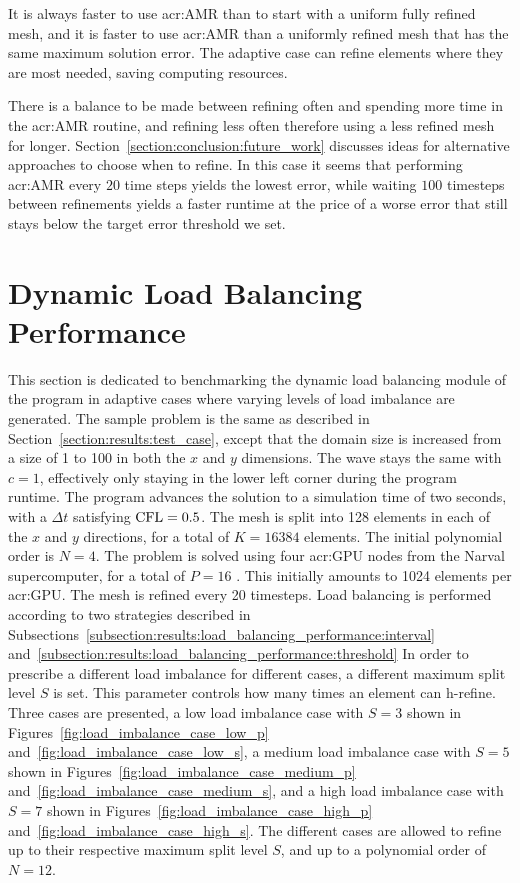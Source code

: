 It is always faster to use \acrshort{acr:AMR} than to start with a uniform fully refined mesh, and
it is faster to use \acrshort{acr:AMR} than a uniformly refined mesh that has the same maximum
solution error. The adaptive case can refine elements where they are most needed, saving computing
resources.

There is a balance to be made between refining often and spending more time in the
\acrshort{acr:AMR} routine, and refining less often therefore using a less refined mesh for longer.
Section~\ref{section:conclusion:future_work} discusses ideas for alternative approaches to choose
when to refine. In this case it seems that performing \acrshort{acr:AMR} every \(20\) time steps
yields the lowest error, while waiting \(100\) timesteps between refinements yields a faster runtime
at the price of a worse error that still stays below the target error threshold we set.

\section{Dynamic Load Balancing Performance}\label{section:results:load_balancing_performance}

This section is dedicated to benchmarking the dynamic load balancing module of the program in
adaptive cases where varying levels of load imbalance are generated. The sample problem is the same
as described in Section~\ref{section:results:test_case}, except that the domain size is increased
from a size of 1 to 100 in both the \(x\) and \(y\) dimensions. The wave stays the same with \(c =
1\), effectively only staying in the lower left corner during the program runtime. The program
advances the solution to a simulation time of two seconds, with a \(\Delta t\) satisfying \(\operatorname{CFL} =
0.5\). The mesh is split into 128 elements in each of the \(x\) and \(y\) directions, for a total of
\(K = 16384\) elements. The initial polynomial order is \(N = 4\). The problem is solved using four
\acrshort{acr:GPU} nodes from the Narval supercomputer, for a total of \(P = 16\)
. This initially amounts to 1024 elements per \acrshort{acr:GPU}. The mesh is
refined every 20 timesteps. Load balancing is performed according to two strategies described in
Subsections~\ref{subsection:results:load_balancing_performance:interval}
and~\ref{subsection:results:load_balancing_performance:threshold} In order to prescribe a different
load imbalance for different cases, a different maximum split level \(S\) is set. This parameter
controls how many times an element can h-refine. Three cases are presented, a low load imbalance
case with \(S = 3\) shown in Figures~\ref{fig:load_imbalance_case_low_p}
and~\ref{fig:load_imbalance_case_low_s}, a medium load imbalance case with \(S = 5\) shown in
Figures~\ref{fig:load_imbalance_case_medium_p} and~\ref{fig:load_imbalance_case_medium_s}, and a
high load imbalance case with \(S = 7\) shown in Figures~\ref{fig:load_imbalance_case_high_p}
and~\ref{fig:load_imbalance_case_high_s}. The different cases are allowed to refine up to their
respective maximum split level \(S\), and up to a polynomial order of \(N = 12\).

